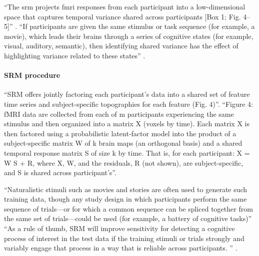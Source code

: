 {


``The \ac{srm} \citep{chen2015reduced} projects \ac{fmri} responses from
each participant into a low-dimensional space that captures temporal variance
shared across participants [Box 1; Fig. 4–5]'' \citep{cohen2017computational}.
%
``If participants are given the same stimulus or task sequence (for example, a
movie), which leads their brains through a series of cognitive states (for
example, visual, auditory, semantic), then identifying shared variance has the
effect of highlighting variance related to these states''
\citep{cohen2017computational}.


\paragraph{SRM procedure}

%
``SRM offers jointly factoring each participant's data into a shared set of
feature time series and subject-specific topographies for each feature (Fig.
4)''\citep{cohen2017computational}.
%
``Figure 4: fMRI data are collected from each of m participants experiencing the
same stimulus and then organized into a matrix X (voxels by time). Each matrix X
is then factored using a probabilistic latent-factor model into the product of a
subject-specific matrix W of k brain maps (an orthogonal basis) and a shared
temporal response matrix S of size k by time. That is, for each participant: X =
W S + R, where X, W, and the residuals, R (not shown), are subject-specific, and
S is shared across participant's''\citep{cohen2017computational}.

``Naturalistic stimuli such as movies and stories are often used to generate
such training data, though any study design in which participants perform the
same sequence of trials—or for which a common sequence can be spliced together
from the same set of trials—could be used (for example, a battery of cognitive
tasks)'' \citep{cohen2017computational}
%
``As a rule of thumb, SRM will improve sensitivity for detecting a cognitive
process of interest in the test data if the training stimuli or trials strongly
and variably engage that process in a way that is reliable across participants.
'' \citep{cohen2017computational}.

}
